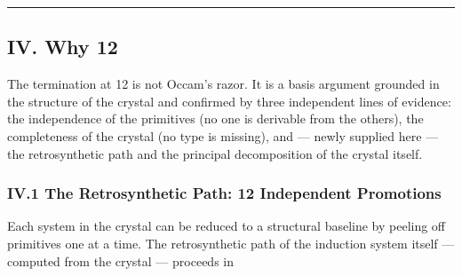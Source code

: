 \documentclass[12pt,a4paper]{article}
\begin{document}
\begin{center}
\rule{0.5\textwidth}{0.4pt}
\end{center}


\subsection{IV. Why 12}
The termination at 12 is not Occam's razor. It is a basis argument grounded in the structure of the crystal and
confirmed by three independent lines of evidence: the independence of the primitives (no one is derivable from the
others), the completeness of the crystal (no type is missing), and --- newly supplied here --- the retrosynthetic path
and the principal decomposition of the crystal itself.

\subsubsection{IV.1 The Retrosynthetic Path: 12 Independent Promotions}
Each system in the crystal can be reduced to a structural baseline by peeling off primitives one at a time. The
retrosynthetic path of the induction system itself --- computed from the crystal --- proceeds in
\end{document}
